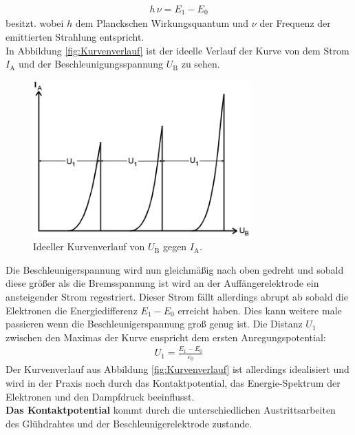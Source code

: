 \begin{align}
	h\, \nu = E_1 - E_0
\end{align}
besitzt. wobei $h$ dem Planckschen Wirkungsquantum und $\nu$ der Frequenz der emittierten Strahlung entspricht. \\
In Abbildung \eqref{fig:Kurvenverlauf} ist der ideelle Verlauf der Kurve von dem Strom $I_\text{A}$ und der Beschleunigungsspannung $U_\text{B}$ zu sehen.

\begin{figure}[H]
	\centering
	\includegraphics[height=6cm]{picture/Kurvenverlauf}
	\caption{Ideeller Kurvenverlauf von $U_\text{B}$ gegen $I_\text{A}$. \cite[4]{sample}}
	\label{fig:Kurvenverlauf}
\end{figure}

Die Beschleunigerspannung wird nun gleichmäßig nach oben gedreht und sobald diese größer als die Bremsspannung ist wird an der Auffängerelektrode ein ansteigender Strom regestriert. Dieser Strom fällt allerdings abrupt ab sobald die Elektronen die Energiedifferenz $E_1 - E_0$ erreicht haben. Dies kann weitere male passieren wenn die Beschleunigerspannung groß genug ist. Die Distanz $U_1$ zwischen den Maximas der Kurve enspricht dem ersten Anregungspotential:
\begin{align}
	U_1 = \frac{E_1 - E_0}{e_0}
\end{align}
Der Kurvenverlauf aus Abbildung \eqref{fig:Kurvenverlauf} ist allerdings idealisiert und wird in der Praxis noch durch das Kontaktpotential, das Energie-Spektrum der Elektronen und den Dampfdruck beeinflusst. \\
\textbf{Das Kontaktpotential} kommt durch die unterschiedlichen Austrittsarbeiten des Glühdrahtes und der Beschleunigerelektrode zustande.


